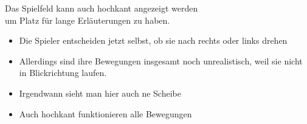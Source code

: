 \documentclass[preview]{standalone}
\begin{document}
\begin{center}
Das Spielfeld kann auch hochkant angezeigt werden\\
        um Platz für lange Erläuterungen zu haben.
        \begin{itemize}
         \item Die Spieler entscheiden jetzt selbst, ob sie nach rechts oder links drehen
         \item Allerdings sind ihre Bewegungen insgesamt noch unrealistisch, weil sie nicht in Blickrichtung laufen.
         \item Irgendwann sieht man hier auch ne Scheibe
         \item Auch hochkant funktionieren alle Bewegungen
        \end{itemize}
\end{center}
\end{document}
